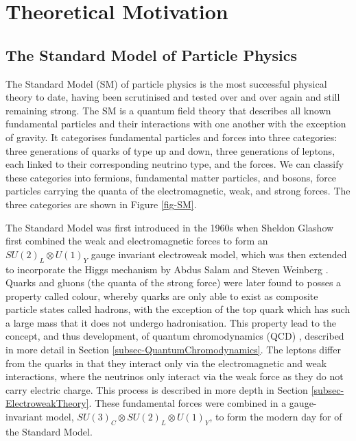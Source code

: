 \chapter{Theoretical Motivation} \label{chap-theory}


\section{The Standard Model of Particle Physics} \label{sec-StandardModel}

The Standard Model (SM) of particle physics is the most successful physical theory to date, having been scrutinised and tested over and over again and still remaining strong. The SM is a quantum field theory that describes all known fundamental particles and their interactions with one another with the exception of gravity. It categorises fundamental particles and forces into three categories: three generations of quarks of type up and down, three generations of leptons, each linked to their corresponding neutrino type, and the forces. We can classify these categories into fermions, fundamental matter particles, and bosons, force particles carrying the quanta of the electromagnetic, weak, and strong forces. The three categories are shown in Figure \ref{fig-SM}. 

The Standard Model was first introduced in the 1960s when Sheldon Glashow first combined the weak and electromagnetic forces \cite{Glashow:1961tr} to form an $SU(2)_L \otimes U(1)_Y$ gauge invariant electroweak model, which was then extended to incorporate the Higgs mechanism by Abdus Salam and Steven Weinberg \cite{PhysRevLett.19.1264, Salam:1959zz}. Quarks and gluons (the quanta of the strong force) were later found to posses a property called colour, whereby quarks are only able to exist as composite particle states called hadrons, with the exception of the top quark which has such a large mass that it does not undergo hadronisation. This property lead to the concept, and thus development, of quantum chromodynamics (QCD) \cite{GellMann:1964nj,PhysRevD.8.3633, PhysRevLett.30.1346}, described in more detail in Section \ref{subsec-QuantumChromodynamics}. The leptons differ from the quarks in that they interact only via the electromagnetic and weak interactions, where the neutrinos only interact via the weak force as they do not carry electric charge. This process is described in more depth in Section \ref{subsec-ElectroweakTheory}. These fundamental forces were combined in a gauge-invariant model, $SU(3)_C \otimes SU(2)_L \otimes U(1)_Y$, to form the modern day for of the Standard Model. 

